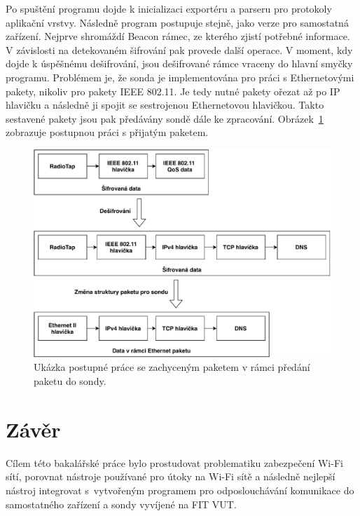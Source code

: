 Po spuštění programu dojde k inicializaci exportéru a parseru pro protokoly aplikační vrstvy. Následně program postupuje stejně, jako verze pro samostatná zařízení. Nejprve shromáždí Beacon rámec, ze kterého zjistí potřebné informace. V závislosti na detekovaném šifrování pak provede další operace. V moment, kdy dojde k úspěšnému dešifrování, jsou dešifrované rámce vraceny do hlavní smyčky programu. 
Problémem je, že sonda je implementována pro práci s Ethernetovými pakety, nikoliv pro pakety IEEE 802.11. Je tedy nutné pakety ořezat až po IP hlavičku a následně ji spojit se sestrojenou Ethernetovou hlavičkou. Takto sestavené pakety jsou pak předávány sondě dále ke zpracování. Obrázek~\ref{img:diagram-sonda} zobrazuje postupnou práci s přijatým paketem.
\begin{figure}[htbp]
  \centering
  \includegraphics[width=14.9cm]{obrazky-figures/diagram-sonda.pdf}
  \caption{Ukázka postupné práce se zachyceným paketem v rámci předání paketu do sondy.}
  \label{img:diagram-sonda}
\end{figure}

\chapter{Závěr}
\label{zaver}
Cílem této bakalářské práce bylo prostudovat problematiku zabezpečení Wi-Fi sítí, porovnat nástroje používané pro útoky na Wi-Fi sítě a následně nejlepší nástroj integrovat s~vytvořeným programem pro odposlouchávání komunikace do samostatného zařízení a sondy vyvíjené na FIT VUT. 

